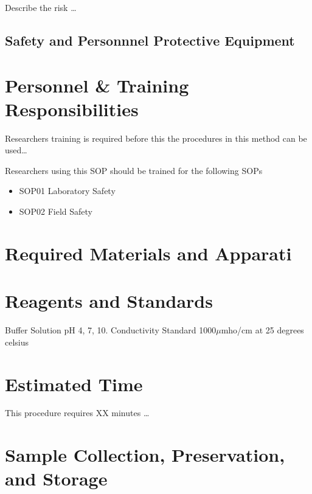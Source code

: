 \documentclass[12pt]{../SOP3_beta}\usepackage[]{graphicx}\usepackage[]{color}
\begin{document}
\NP Describe the risk \dots


\subsection{Safety and Personnnel Protective Equipment}


\section{Personnel \& Training Responsibilities}

\NP Researchers training is required before this the procedures in this method can be used\dots 

\NP Researchers using this SOP should be trained for the following SOPs

\begin{itemize}
  \item SOP01 Laboratory Safety
  \item SOP02 Field Safety
\end{itemize}

\section{Required Materials and Apparati}


\section{Reagents and Standards}

\NP Buffer Solution pH 4, 7, 10. 
\NP Conductivity Standard 1000$\mu$mho/cm at 25 degrees celsius 

\section{Estimated Time}

\NP This procedure requires XX minutes \dots

\section{Sample Collection, Preservation, and Storage}
\end{document}
